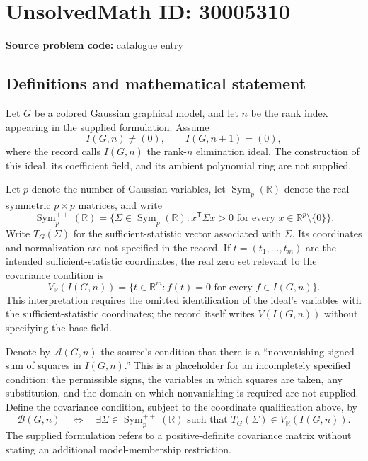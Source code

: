 \documentclass[11pt]{article}
\newcommand{\R}{\mathbb{R}}
\begin{document}
\section*{UnsolvedMath ID: 30005310}
\textbf{Source problem code:} catalogue entry
\subsection{Definitions and mathematical statement}
Let \(G\) be a colored Gaussian graphical model, and let \(n\) be the rank index appearing in the supplied formulation. Assume
\[
I(G,n)\ne(0),\qquad I(G,n+1)=(0),
\]
where the record calls \(I(G,n)\) the rank-\(n\) elimination ideal. The construction of this ideal, its coefficient field, and its ambient polynomial ring are not supplied.

Let \(p\) denote the number of Gaussian variables, let \(\operatorname{Sym}_p(\R)\) denote the real symmetric \(p\times p\) matrices, and write
\[
\operatorname{Sym}_p^{++}(\R)
=\{\Sigma\in\operatorname{Sym}_p(\R):x^{\mathsf T}\Sigma x>0
\text{ for every }x\in\R^p\setminus\{0\}\}.
\]
Write \(T_G(\Sigma)\) for the sufficient-statistic vector associated with \(\Sigma\). Its coordinates and normalization are not specified in the record. If \(t=(t_1,\ldots,t_m)\) are the intended sufficient-statistic coordinates, the real zero set relevant to the covariance condition is
\[
V_{\R}(I(G,n))
=\{t\in\R^m:f(t)=0\text{ for every }f\in I(G,n)\}.
\]
This interpretation requires the omitted identification of the ideal's variables with the sufficient-statistic coordinates; the record itself writes \(V(I(G,n))\) without specifying the base field.

Denote by \(\mathcal A(G,n)\) the source's condition that there is a ``nonvanishing signed sum of squares in \(I(G,n)\).'' This is a placeholder for an incompletely specified condition: the permissible signs, the variables in which squares are taken, any substitution, and the domain on which nonvanishing is required are not supplied. Define the covariance condition, subject to the coordinate qualification above, by
\[
\mathcal B(G,n)\quad\Longleftrightarrow\quad
\exists\Sigma\in\operatorname{Sym}_p^{++}(\R)
\text{ such that }T_G(\Sigma)\in V_{\R}(I(G,n)).
\]
The supplied formulation refers to a positive-definite covariance matrix without stating an additional model-membership restriction.
\end{document}
